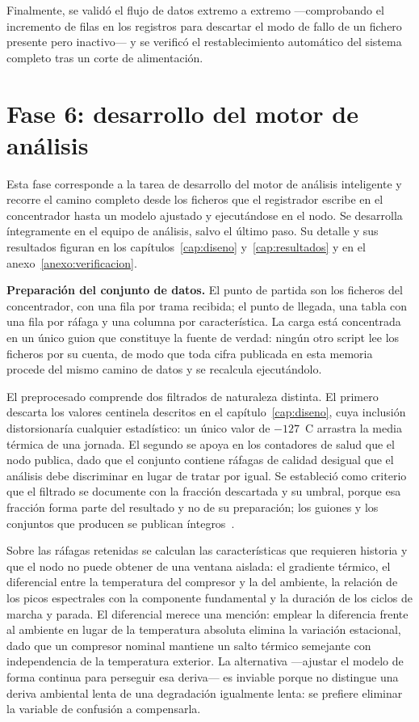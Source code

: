 Finalmente, se validó el flujo de datos extremo a extremo —comprobando el incremento de filas en
los registros para descartar el modo de fallo de un fichero presente pero inactivo— y se verificó
el restablecimiento automático del sistema completo tras un corte de alimentación.

\section{Fase 6: desarrollo del motor de análisis}

Esta fase corresponde a la tarea de desarrollo del motor de análisis inteligente y recorre el
camino completo desde los ficheros que el registrador escribe en el concentrador hasta un modelo
ajustado y ejecutándose en el nodo. Se desarrolla íntegramente en el equipo de análisis, salvo el
último paso. Su detalle y sus resultados figuran en los capítulos~\ref{cap:diseno}
y~\ref{cap:resultados} y en el anexo~\ref{anexo:verificacion}.

\textbf{Preparación del conjunto de datos.} El punto de partida son los ficheros del concentrador,
con una fila por trama recibida; el punto de llegada, una tabla con una fila por ráfaga y una
columna por característica. La carga está concentrada en un único guion que constituye la fuente
de verdad: ningún otro script lee los ficheros por su cuenta, de modo que toda cifra publicada en
esta memoria procede del mismo camino de datos y se recalcula ejecutándolo.

El preprocesado comprende dos filtrados de naturaleza distinta. El primero descarta los valores
centinela descritos en el capítulo~\ref{cap:diseno}, cuya inclusión distorsionaría cualquier
estadístico: un único valor de \mbox{$-127$ \textdegree C} arrastra la media térmica de una
jornada. El segundo se apoya en los contadores de salud que el nodo publica, dado que el conjunto
contiene ráfagas de calidad desigual que el análisis debe discriminar en lugar de tratar por igual.
Se estableció como criterio que el filtrado se documente con la fracción descartada y su umbral,
porque esa fracción forma parte del resultado y no de su preparación; los guiones y los conjuntos
que producen se publican íntegros~\cite{repotfm}.

Sobre las ráfagas retenidas se calculan las características que requieren historia y que el nodo no
puede obtener de una ventana aislada: el gradiente térmico, el diferencial entre la temperatura del
compresor y la del ambiente, la relación de los picos espectrales con la componente fundamental y
la duración de los ciclos de marcha y parada. El diferencial merece una mención: emplear la
diferencia frente al ambiente en lugar de la temperatura absoluta elimina la variación estacional,
dado que un compresor nominal mantiene un salto térmico semejante con independencia de la
temperatura exterior. La alternativa —ajustar el modelo de forma continua para perseguir esa
deriva— es inviable porque no distingue una deriva ambiental lenta de una degradación igualmente
lenta: se prefiere eliminar la variable de confusión a compensarla.


